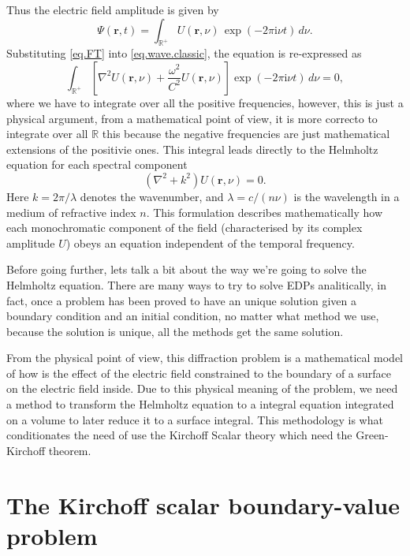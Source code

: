 	Thus the electric field amplitude is given by
	\begin{equation}
		\Psi(\mathbf{r},t) = \int_{\mathbb{R}^{+}} U(\mathbf{r},\nu) \, \exp(-2\pi\mathrm{i}\nu t) \, d\nu .
		\label{eq.FT}
	\end{equation}
	Substituting \eqref{eq.FT} into \eqref{eq.wave.classic}, the equation is re-expressed as
	\begin{equation}
		\int_{\mathbb{R}^{+}} \left[ \nabla^{2}U(\mathbf{r},\nu) + \frac{\omega^{2}}{C^{2}} U(\mathbf{r},\nu) \right] \exp(-2\pi\mathrm{i}\nu t) \, d\nu = 0,
	\end{equation}
	where we have to integrate over all the positive frequencies, however, this is just a physical argument, from a mathematical point of view, it is more correcto to integrate over all $\mathbb{R}$ this because the negative frequencies are just mathematical extensions of the positivie ones. This integral leads directly to the Helmholtz equation for each spectral component
	\begin{equation}
		(\nabla^{2} + k^{2})U(\mathbf{r},\nu) = 0 .
	\end{equation}
	Here $k = 2\pi/\lambda$ denotes the wavenumber, and $\lambda = c/(n\nu)$ is the wavelength in a medium of refractive index $n$. This formulation describes mathematically how each monochromatic component of the field (characterised by its complex amplitude $U$) obeys an equation independent of the temporal frequency.

	Before going further, lets talk a bit about the way we're going to solve the Helmholtz equation. There are many ways to try to solve EDPs analitically, in fact, once a problem has been proved to have an unique solution given a boundary condition and an initial condition, no matter what method we use, because the solution is unique, all the methods get the same solution.

	From the physical point of view, this diffraction problem is a mathematical model of how is the effect of the electric field constrained to the boundary of a surface on the electric field inside. Due to this physical meaning of the problem, we need a method to transform the Helmholtz equation to a integral equation integrated on a volume to later reduce it to a surface integral. This methodology is what conditionates the need of use the Kirchoff Scalar theory which need the Green-Kirchoff theorem.

\section{The Kirchoff scalar boundary-value problem}

